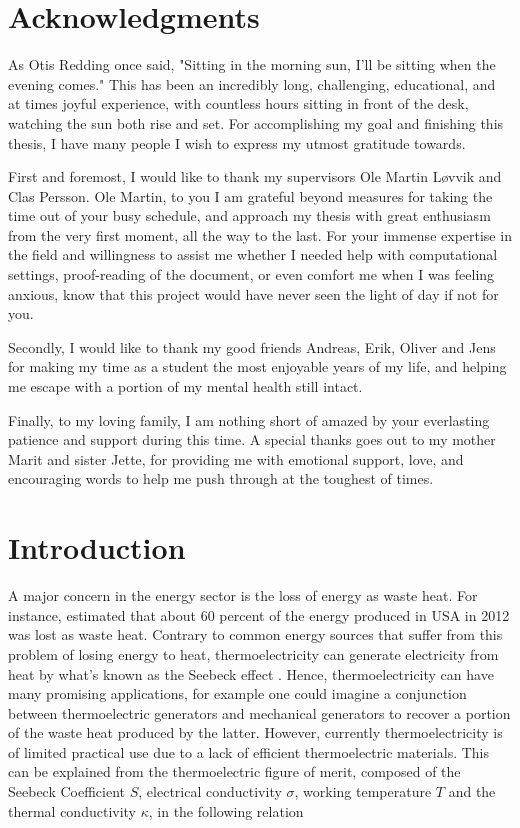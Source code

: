 \documentclass[UKenglish]{ifimaster}  %
\begin{document}
\chapter*{Acknowledgments}                  %
As Otis Redding once said, "Sitting in the morning sun, I'll be sitting when the evening comes." This has been an incredibly long, challenging, educational, and at times joyful experience, with countless hours sitting in front of the desk, watching the sun both rise and set. For accomplishing my goal and finishing this thesis, I have many people I wish to express my utmost gratitude towards.

First and foremost, I would like to thank my supervisors Ole Martin Løvvik and Clas Persson. Ole Martin, to you I am grateful beyond measures for taking the time out of your busy schedule, and approach my thesis with great enthusiasm from the very first moment, all the way to the last. For your immense expertise in the field and willingness to assist me whether I needed help with computational settings, proof-reading of the document, or even comfort me when I was feeling anxious, know that this project would have never seen the light of day if not for you.

Secondly, I would like to thank my good friends Andreas, Erik, Oliver and Jens for making my time as a student the most enjoyable years of my life, and helping me escape with a portion of my mental health still intact. 

Finally, to my loving family, I am nothing short of amazed by your everlasting patience and support during this time. A special thanks goes out to my mother Marit and sister Jette, for providing me with emotional support, love, and encouraging words to help me push through at the toughest of times.

\tableofcontents{}
\listoffigures{}
\listoftables{}

\mainmatter{}

\chapter{Introduction}                  %

A major concern in the energy sector is the loss of energy as waste heat. For instance, \cite{thermo} estimated that about 60 percent of the energy produced in USA in 2012 was lost as waste heat. Contrary to common energy sources that suffer from this problem of losing energy to heat, thermoelectricity can generate electricity from heat by what's known as the Seebeck effect \cite{wikipedia_thermoelectric_2020}. Hence, thermoelectricity can have many promising applications, for example one could imagine a conjunction between thermoelectric generators and mechanical generators to recover a portion of the waste heat produced by the latter. However, currently thermoelectricity is of limited practical use due to a lack of efficient thermoelectric materials.  This can be explained from the thermoelectric figure of merit, composed of the Seebeck Coefficient $S$, electrical conductivity $\sigma$, working temperature $T$ and the thermal conductivity $\kappa$, in the following relation \cite{bandgap2Dirac} 
\end{document}
